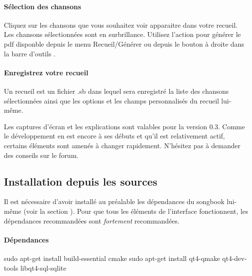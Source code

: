 \documentclass[online]{patacrep}
\begin{document}
\paragraph{Sélection des chansons}
Cliquez sur les chansons que vous souhaitez voir apparaitre dans votre
recueil.  Les chansons sélectionnées sont en surbrillance. Utilisez
l'action  pour générer le pdf disponble depuis le
menu Recueil/Générer ou depuis le bouton à droite dans la barre
d'outils .

\paragraph{Enregistrez votre recueil}
Un recueil est un fichier .sb dans lequel sera enregistré la liste des
chansons sélectionnées ainsi que les options et les champs
personnalisés du recueil lui-même.


\begin{nota} 
  Les captures d'écran et les explications sont valables pour la
  version 0.3. Comme le développement en est encore à ses débuts et
  qu'il est relativement actif, certains éléments sont amenés à
  changer rapidement. N'hésitez pas à demander des conseils sur le
  forum.
\end{nota}

\subsection{Installation depuis les sources}

\begin{nota}
  Il est nécessaire d'avoir installé au préalable les dépendances du
  songbook lui-même (voir la section
  ). Pour que tous les éléments
  de l'interface fonctionnent, les dépendances recommandées sont
  \emph{fortement} recommandées.
\end{nota}

\paragraph{Dépendances}
\begin{unixcom}
  sudo apt-get install build-essential cmake
  sudo apt-get install qt4-qmake qt4-dev-tools libqt4-sql-sqlite
\end{unixcom}
\end{document}
